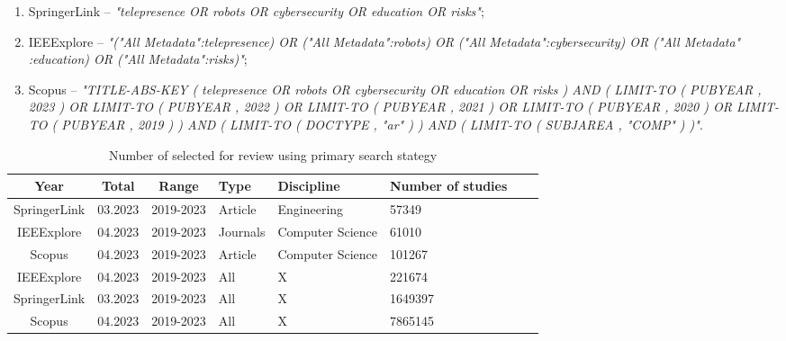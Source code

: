 \begin{enumerate}
\item SpringerLink -- \textit{"telepresence OR robots OR cybersecurity OR education OR risks"};
\item IEEExplore -- \textit{"("All Metadata":telepresence) OR ("All Metadata":robots) OR ("All Metadata":cybersecurity) OR ("All Metadata"
:education) OR ("All Metadata":risks)"};
\item Scopus -- \textit{"TITLE-ABS-KEY ( telepresence OR robots OR cybersecurity OR education OR risks )  AND  ( LIMIT-TO ( PUBYEAR ,
2023 )  OR LIMIT-TO ( PUBYEAR ,  2022 )  OR LIMIT-TO ( PUBYEAR ,  2021 )  OR LIMIT-TO ( PUBYEAR ,  2020 )  OR LIMIT-TO ( PUBYEAR
,  2019 ) )  AND  ( LIMIT-TO ( DOCTYPE ,  "ar" ) )  AND  ( LIMIT-TO ( SUBJAREA ,  "COMP" ) )"}.
\end{enumerate}


\begin{table}[htb]
\centering
\smaller
\caption{Number of selected for review using primary search stategy}
\label{tab:query-results}
\begin{tabularx}{\textwidth}{|c|c|c|Y|Y|Y|Y|Y|}
\hline
\textbf{Year} & \textbf{Total} & \textbf{Range} & \textbf{Type} & \textbf{Discipline} & \textbf{Number of studies} \\\hline
SpringerLink  & 03.2023        & 2019-2023      & Article       & Engineering         & 57349                      \\\hline
IEEExplore    & 04.2023        & 2019-2023      & Journals      & Computer Science    & 61010                      \\\hline
Scopus        & 04.2023        & 2019-2023      & Article       & Computer Science    & 101267                     \\\hline
IEEExplore    & 04.2023        & 2019-2023      & All           & X                   & 221674                     \\\hline
SpringerLink  & 03.2023        & 2019-2023      & All           & X                   & 1649397                    \\\hline
Scopus        & 04.2023        & 2019-2023      & All           & X                   & 7865145                    \\\hline
\end{tabularx}
\end{table}

